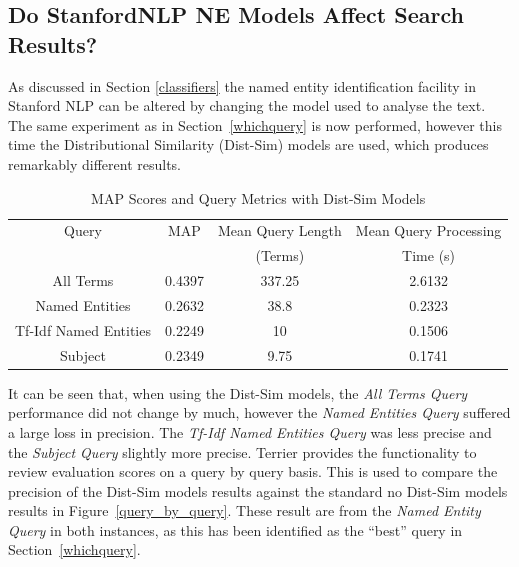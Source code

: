 \documentclass{l4proj}
\begin{document}
\subsection{Do StanfordNLP NE Models Affect Search Results?} \label{distsim}
As discussed in Section \ref{classifiers} the named entity identification facility in Stanford NLP can be altered by changing the model used to analyse the text. The same experiment as in Section~\ref{whichquery} is now performed, however this time the Distributional Similarity (Dist-Sim) models are used, which produces remarkably different results.
\begin{table}
\centering
\begin{tabular}{|c|c|c|c|}
\hline
Query                 & MAP    & Mean Query Length & Mean Query Processing \\ 
& & (Terms) & Time (s) \\\hline
All Terms             & 0.4397 & 337.25             & 2.6132                      \\ \hline
Named Entities        & 0.2632 & 38.8             & 0.2323                         \\ \hline
Tf-Idf Named Entities & 0.2249 & 10                & 0.1506                       \\ \hline
Subject               & 0.2349 & 9.75              & 0.1741                        \\ \hline
\end{tabular}
\caption{MAP Scores and Query Metrics with Dist-Sim Models}
\label{results}
\end{table}
It can be seen that, when using the Dist-Sim models, the \textit{All Terms Query} performance did not change by much, however the \textit{Named Entities Query} suffered a large loss in precision. The \textit{Tf-Idf Named Entities Query} was less precise and the \textit{Subject Query} slightly more precise.
Terrier provides the functionality to review evaluation scores on a query by query basis. This is used to compare the precision of the Dist-Sim models results against the standard no Dist-Sim models results in Figure~\ref{query_by_query}. These result are from the \textit{Named Entity Query} in both instances, as this has been identified as the ``best'' query in Section~\ref{whichquery}.
\end{document}
